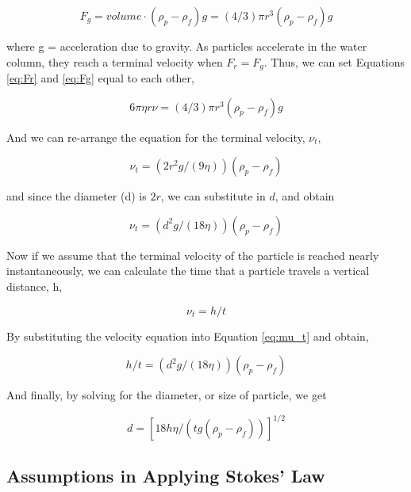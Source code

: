 \documentclass{tufte-handout}
\begin{document}
\begin{equation}\label{eq:Fg}
F_g = volume \cdot (\rho_p - \rho_f)g = (4/3)\pi r^3(\rho_p - \rho_f)g 
\end{equation}

\noindent where g = acceleration due to gravity. 
As particles accelerate in the water column, they reach a terminal velocity when $F_r = F_g$. Thus, we can set Equations \ref{eq:Fr} and \ref{eq:Fg} equal to each other,

\begin{equation}
6\pi \eta r \nu = (4/3)\pi r^3(\rho_p - \rho_f)g
\end{equation}

\noindent And we can re-arrange the equation for the terminal velocity, $\nu_t$,

\begin{equation}
\nu_t = (2r^2g/(9\eta))(\rho_p - \rho_f)
\end{equation}

\noindent and since the diameter (d) is $2r$, we can substitute in $d$, and obtain 

\begin{equation}\label{eq:mu_t}
\nu_t = (d^2g/(18\eta))(\rho_p - \rho_f)
\end{equation}

\noindent Now if we assume that the terminal velocity of the particle is reached nearly instantaneously, we can calculate the time that a particle travels a vertical distance, h, 

\begin{equation}
\nu_t = h/t
\end{equation}
 
\noindent By substituting the velocity equation into Equation \ref{eq:mu_t} and obtain,

\begin{equation}
h/t = (d^2g/(18\eta))(\rho_p - \rho_f)
\end{equation}

\noindent And finally, by solving for the diameter, or size of particle, we get

\begin{equation}
d = [18h\eta/(tg(\rho_p - \rho_f))]^{1/2}
\end{equation}

\subsection{Assumptions in Applying Stokes' Law}
\end{document}
